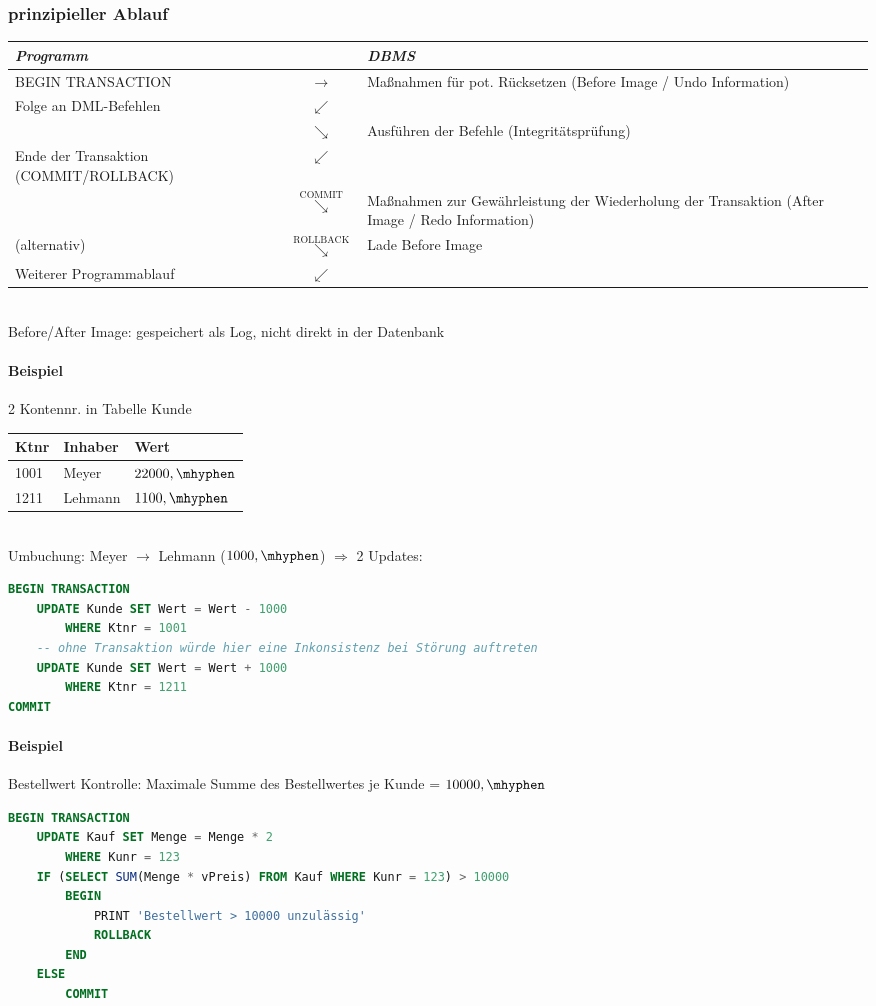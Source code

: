 \subsubsection*{prinzipieller Ablauf}
\begin{tabular}{L{0.3} c L{0.5}}
\emph{Programm} & & \emph{DBMS}\\
\hline 
BEGIN TRANSACTION &$\to$& Maßnahmen für pot. Rücksetzen \newline (Before Image / Undo Information)\\
Folge an DML-Befehlen & $\swarrow$ & \\
&$\searrow$ & Ausführen der Befehle (Integritätsprüfung)\\
Ende der Transaktion \newline (COMMIT/ROLLBACK) & $\swarrow$ & \\
&$\overset{\text{COMMIT}}{\searrow}$ & Maßnahmen zur Gewährleistung der Wiederholung der Transaktion \newline (After Image / Redo Information)\\
\hfill (alternativ) & $\overset{\text{ROLLBACK}}{\searrow}$ & Lade Before Image\\
Weiterer Programmablauf & $\swarrow$ & 
\end{tabular}\\
Before/After Image: gespeichert als Log, nicht direkt in der Datenbank

\paragraph{Beispiel} 2 Kontennr. in Tabelle Kunde\\
\begin{tabular}{l|l|l}
Ktnr & Inhaber & Wert\\
\hline
1001 & Meyer & $22000,\mhyphen$\\
1211 & Lehmann & $1100,\mhyphen$
\end{tabular}\\
Umbuchung: Meyer $\to$ Lehmann ($1000,\mhyphen$) $\Rightarrow$ 2 Updates:
\begin{lstlisting}[language=SQL]
BEGIN TRANSACTION
	UPDATE Kunde SET Wert = Wert - 1000
		WHERE Ktnr = 1001
	-- ohne Transaktion würde hier eine Inkonsistenz bei Störung auftreten
	UPDATE Kunde SET Wert = Wert + 1000
		WHERE Ktnr = 1211
COMMIT
\end{lstlisting}

\paragraph{Beispiel} Bestellwert Kontrolle: Maximale Summe des Bestellwertes je Kunde = $10000,\mhyphen$
\begin{lstlisting}[language=SQL]
BEGIN TRANSACTION
	UPDATE Kauf SET Menge = Menge * 2
		WHERE Kunr = 123
	IF (SELECT SUM(Menge * vPreis) FROM Kauf WHERE Kunr = 123) > 10000
		BEGIN
			PRINT 'Bestellwert > 10000 unzulässig'
			ROLLBACK
		END
	ELSE
		COMMIT
\end{lstlisting}

